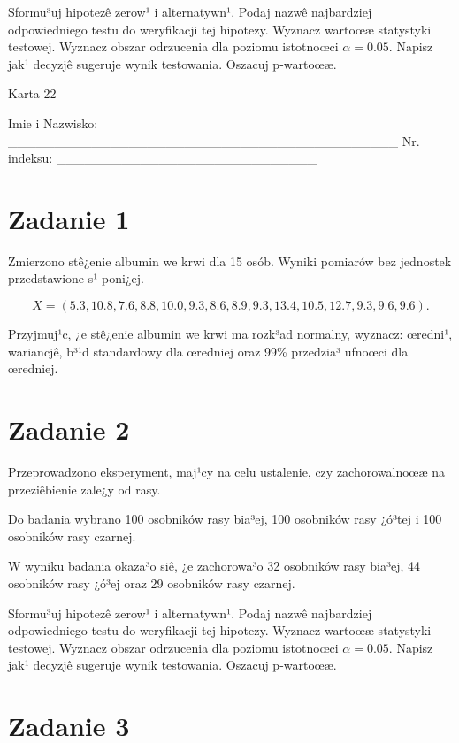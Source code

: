 \documentclass[a4paper,12pt]{article}
\begin{document}
     Sformu³uj hipotezê zerow¹ i alternatywn¹. 
     Podaj nazwê najbardziej odpowiedniego testu do weryfikacji tej hipotezy. 
     Wyznacz wartoœæ statystyki testowej. 
     Wyznacz obszar odrzucenia dla poziomu istotnoœci $\alpha=0.05$. 
     Napisz jak¹ decyzjê sugeruje wynik testowania. 
     Oszacuj p-wartoœæ. \vspace{1cm} 

  \clearpage  Karta  22  

 Imie i Nazwisko: \_\_\_\_\_\_\_\_\_\_\_\_\_\_\_\_\_\_\_\_\_\_\_\_\_\_\_\_\_\_\_\_\_\_\_\_\_\_\_\_\_\_ Nr. indeksu: \_\_\_\_\_\_\_\_\_\_\_\_\_\_\_\_\_\_\_\_\_\_\_\_\_\_\_\_ 
 \section*{Zadanie 1}
     
     Zmierzono stê¿enie albumin we krwi dla 15 osób. 
     Wyniki pomiarów bez jednostek przedstawione s¹ poni¿ej. 
     
     \noindent $$X=(  5.3, 10.8,  7.6,  8.8, 10.0,  9.3,  8.6,  8.9,  9.3, 13.4, 10.5, 12.7,  9.3,  9.6,  9.6 ).$$
     
     Przyjmuj¹c, ¿e stê¿enie albumin we krwi ma rozk³ad normalny, 
     wyznacz: œredni¹, wariancjê, b³¹d standardowy dla œredniej oraz 99\% przedzia³ ufnoœci dla œredniej. \vspace{1cm} 

  \section*{Zadanie 2}
     
  Przeprowadzono eksperyment, maj¹cy na celu ustalenie, czy zachorowalnoœæ na przeziêbienie zale¿y od rasy.
  
  Do badania wybrano 100 osobników rasy bia³ej, 100 osobników rasy ¿ó³tej i 100 osobników rasy czarnej. 
  
  W wyniku badania okaza³o siê, ¿e zachorowa³o 32 osobników rasy bia³ej, 44 osobników rasy ¿ó³ej oraz 29 osobników rasy czarnej. 
  
  Sformu³uj hipotezê zerow¹ i alternatywn¹. 
  Podaj nazwê najbardziej odpowiedniego testu do weryfikacji tej hipotezy. 
  Wyznacz wartoœæ statystyki testowej. 
  Wyznacz obszar odrzucenia dla poziomu istotnoœci $\alpha=0.05$. 
  Napisz jak¹ decyzjê sugeruje wynik testowania. Oszacuj p-wartoœæ. \vspace{1cm} 

  \section*{Zadanie 3}
     
\end{document}
